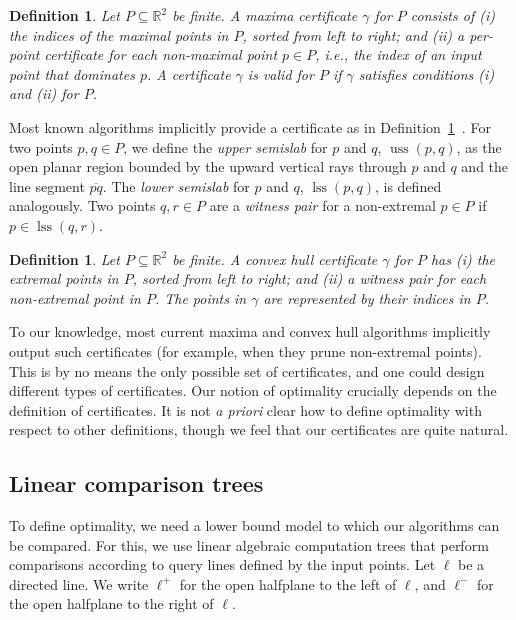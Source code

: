 \documentclass[letterpaper,11pt]{article}
\newtheorem{definition}[theorem]{Definition}
\newcommand{\R}{\mathbb{R}}
\DeclareMathOperator{\uss}{uss}
\DeclareMathOperator{\lss}{lss}
\begin{document}
\begin{definition}\label{def:cert-max}
  Let $P \subseteq \R^2$  be finite.
  A \emph{maxima certificate} $\gamma$ 
  for $P$ consists of \textup(i\textup) 
  the indices of the maximal points 
  in $P$, sorted from left to right; 
  and \textup(ii\textup) a \emph{per-point 
  certificate} for each non-maximal 
  point $p \in P$, i.e., the index 
  of an input point that dominates 
  $p$.  A certificate $\gamma$ is 
  \emph{valid} for $P$ if $\gamma$ 
  satisfies conditions (i) and (ii) 
  for $P$.
\end{definition}

Most known algorithms implicitly 
provide a certificate as in 
Definition~\ref{def:cert-max}~\cite{KungLuPr75,Golin94,KirkpatrickSe86}. 
For two points $p, q \in P$, we 
define the \emph{upper semislab} 
for $p$ and $q$, $\uss(p,q)$,
as the open planar region 
bounded by the upward vertical 
rays through $p$ and $q$ and 
the line segment $\overline{pq}$. 
The \emph{lower semislab} for 
$p$ and $q$, $\lss(p,q)$,
is defined analogously. Two 
points $q,r \in P$ are a 
\emph{witness pair} for a 
non-extremal $p \in P$ if 
$p \in \lss(q,r)$.


\begin{definition}\label{def:cert-ch}
  Let $P \subseteq \R^2$ be finite. A 
  \emph{convex hull certificate} $\gamma$ 
  for $P$ has \textup(i\textup) 
  the extremal points in $P$, sorted from 
  left to right; and \textup(ii\textup) a 
  witness pair for each non-extremal point 
  in $P$. The points in $\gamma$ are 
  represented by their indices in $P$.
\end{definition}

To our knowledge, most current maxima and convex hull algorithms implicitly output 
such certificates (for example, when they prune non-extremal points). This is by no means
the only possible set of certificates, and one could design different types of certificates. Our notion
of optimality crucially depends on the definition of certificates. It is not \emph{a priori} clear
how to define optimality with respect to other definitions, though we feel that our certificates are quite
natural.

\subsection{Linear comparison trees}

To define optimality, we need 
a lower bound model to which
our algorithms can be compared.
For this, we use linear algebraic 
computation trees that perform 
comparisons according to query lines 
defined by the input points. 
Let $\ell$ be a directed line. We write 
$\ell^+$ for the open halfplane
to the left of $\ell$, and $\ell^-$ for 
the open halfplane to the right of $\ell$. 
\end{document}
